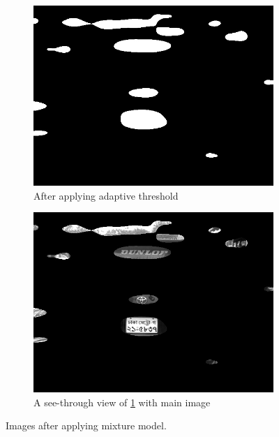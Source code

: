 \documentclass{standalone}
\begin{document}
\begin{figure}
\begin{subfigure}{.5\textwidth}
  \includegraphics[width=.8\linewidth]{./img/sample/stage5-1.jpg}
  \caption{After applying adaptive threshold}
  \label{fig:ThresholdMixtureModel}
\end{subfigure}
\begin{subfigure}{.5\textwidth}
  \centering
  \includegraphics[width=.8\linewidth]{./img/sample/stage5-2.jpg}
  \caption{A see-through view of \ref{fig:ThresholdMixtureModel} with main image}
  \label{fig:GlassViewMixtureModel}
\end{subfigure}
\caption{Images after applying mixture model.}
\label{fig:MixtureModel}
\end{figure}
\end{document}
